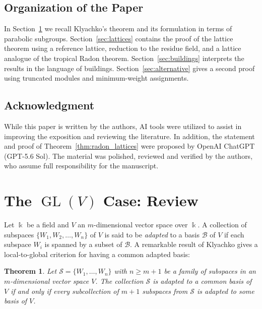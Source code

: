 \documentclass[12pt]{amsart}
\newtheorem{theorem}{Theorem}[section]
\theoremstyle{definition}
\theoremstyle{remark}
\begin{document}
\subsection*{Organization of the Paper}
In Section~\ref{sec:review} we recall Klyachko's theorem and its formulation in terms of parabolic subgroups. Section~\ref{sec:lattices} contains the proof of the lattice theorem using a reference lattice, reduction to the residue field, and a lattice analogue of the tropical Radon theorem. %
Section~\ref{sec:buildings} interprets the results in the language of buildings. Section~\ref{sec:alternative} gives
a second proof using truncated modules and minimum-weight assignments.
 

\subsection*{Acknowledgment}
While this paper is written by the authors, AI tools were utilized to assist in improving the exposition and reviewing the literature. In addition, the statement and proof of Theorem~\ref{thm:radon_lattices} were proposed by OpenAI ChatGPT (GPT-5.6 Sol). The material was polished, reviewed and verified by the authors, who assume full responsibility for the manuscript.


\section{The \texorpdfstring{$\operatorname{GL}(V)$}{GL(V)} Case: Review}
\label{sec:review}

Let $\Bbbk$ be a field and $V$ an $m$-dimensional vector space over $\Bbbk$. A collection of subspaces $\{W_1, W_2, \dots, W_n\}$ of $V$ is said to be \emph{adapted} to a basis $\mathcal{B}$ of $V$ if each subspace $W_i$ is spanned by a subset of $\mathcal{B}$. A remarkable result of Klyachko \cite[Theorem~6.1.2]{Klyachko} gives a local-to-global criterion for having a common adapted basis:

\begin{theorem}
\label{thm:Klyachko}
Let $\mathcal{S} = \{W_1, \dots, W_n\}$ with $n\ge m+1$ be a family of subspaces in an $m$-dimensional vector space $V$. The collection $\mathcal{S}$ is adapted to a common basis of $V$ if and only if every subcollection of $m+1$ subspaces from $\mathcal{S}$ is adapted to some basis of $V$.
\end{theorem}
\end{document}

